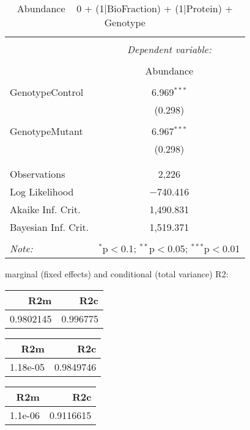\documentclass[11pt]{report}
\begin{document}
\begin{table}[!htbp] \centering 
  \caption{Abundance ~ 0 + (1|BioFraction) + (1|Protein) + Genotype} 
  \label{} 
\begin{tabular}{@{\extracolsep{5pt}}lc} 
\\[-1.8ex]\hline 
\hline \\[-1.8ex] 
 & \multicolumn{1}{c}{\textit{Dependent variable:}} \\ 
\cline{2-2} 
\\[-1.8ex] & Abundance \\ 
\hline \\[-1.8ex] 
 GenotypeControl & 6.969$^{***}$ \\ 
  & (0.298) \\ 
  & \\ 
 GenotypeMutant & 6.967$^{***}$ \\ 
  & (0.298) \\ 
  & \\ 
\hline \\[-1.8ex] 
Observations & 2,226 \\ 
Log Likelihood & $-$740.416 \\ 
Akaike Inf. Crit. & 1,490.831 \\ 
Bayesian Inf. Crit. & 1,519.371 \\ 
\hline 
\hline \\[-1.8ex] 
\textit{Note:}  & \multicolumn{1}{r}{$^{*}$p$<$0.1; $^{**}$p$<$0.05; $^{***}$p$<$0.01} \\ 
\end{tabular} 
\end{table} 
marginal (fixed effects) and conditional (total variance) R2:

\begin{tabular}{r|r}
\hline
R2m & R2c\\
\hline
0.9802145 & 0.996775\\
\hline
\end{tabular}

\begin{tabular}{r|r}
\hline
R2m & R2c\\
\hline
1.18e-05 & 0.9849746\\
\hline
\end{tabular}

\begin{tabular}{r|r}
\hline
R2m & R2c\\
\hline
1.1e-06 & 0.9116615\\
\hline
\end{tabular}
\end{document}
